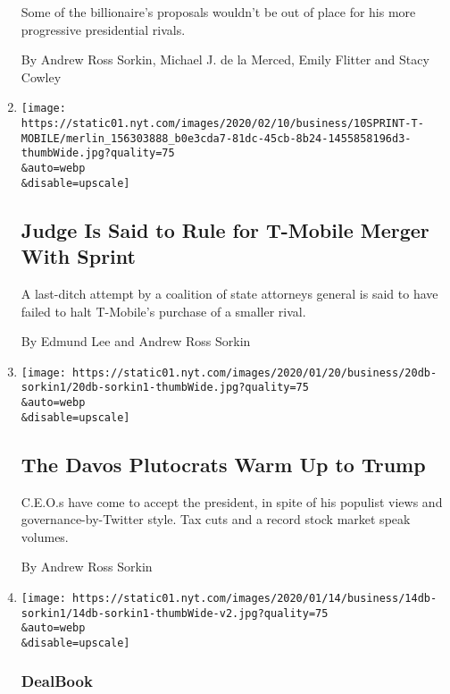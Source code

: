 \begin{enumerate}
  Some of the billionaire's proposals wouldn't be out of place for his
  more progressive presidential rivals.

  By Andrew Ross Sorkin, Michael J. de la Merced, Emily Flitter and
  Stacy Cowley
\item
  \href{/2020/02/10/business/media/sprint-tmobile-merger.html}{}

  \texttt{[image: https://static01.nyt.com/images/2020/02/10/business/10SPRINT-T-MOBILE/merlin\_156303888\_b0e3cda7-81dc-45cb-8b24-1455858196d3-thumbWide.jpg?quality=75\\\&auto=webp\\\&disable=upscale]}

  \hypertarget{judge-is-said-to-rule-for-t-mobile-merger-with-sprint}{%
  \subsection{Judge Is Said to Rule for T-Mobile Merger With
  Sprint}\label{judge-is-said-to-rule-for-t-mobile-merger-with-sprint}}

  A last-ditch attempt by a coalition of state attorneys general is said
  to have failed to halt T-Mobile's purchase of a smaller rival.

  By Edmund Lee and Andrew Ross Sorkin
\item
  \href{/2020/01/20/business/dealbook/donald-trump-davos.html}{}

  \texttt{[image: https://static01.nyt.com/images/2020/01/20/business/20db-sorkin1/20db-sorkin1-thumbWide.jpg?quality=75\\\&auto=webp\\\&disable=upscale]}

  \hypertarget{the-davos-plutocrats-warm-up-to-trump}{%
  \subsection{The Davos Plutocrats Warm Up to
  Trump}\label{the-davos-plutocrats-warm-up-to-trump}}

  C.E.O.s have come to accept the president, in spite of his populist
  views and governance-by-Twitter style. Tax cuts and a record stock
  market speak volumes.

  By Andrew Ross Sorkin
\item
  \href{/2020/01/14/business/dealbook/larry-fink-blackrock-climate-change.html}{}

  \texttt{[image: https://static01.nyt.com/images/2020/01/14/business/14db-sorkin1/14db-sorkin1-thumbWide-v2.jpg?quality=75\\\&auto=webp\\\&disable=upscale]}

  \hypertarget{dealbook-4}{%
  \subsubsection{DealBook}\label{dealbook-4}}


\end{enumerate}
